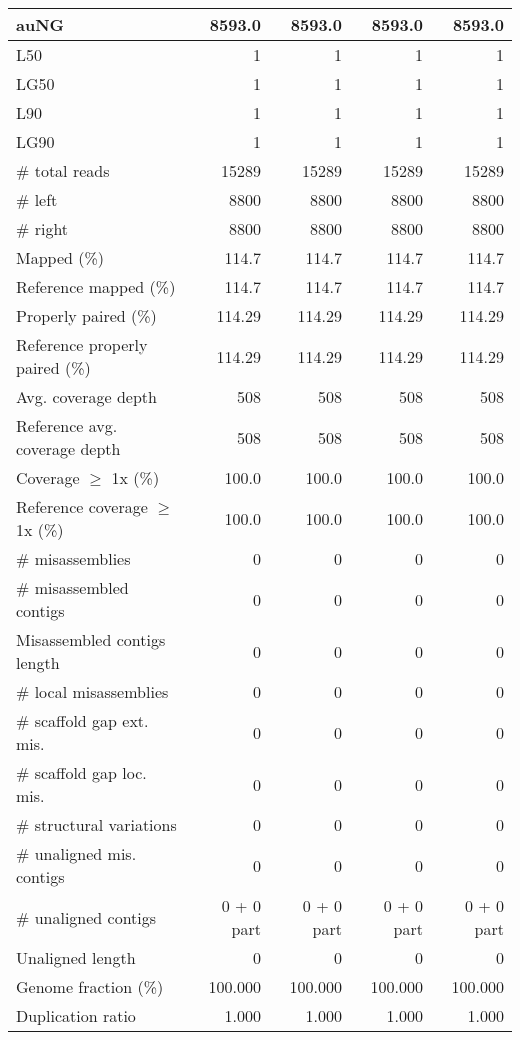 \documentclass[12pt,a4paper]{article}
\begin{document}
\begin{table}[ht]
\begin{center}
\begin{tabular}{|l*{4}{|r}|}
auNG & 8593.0 & 8593.0 & 8593.0 & 8593.0 \\ \hline
L50 & 1 & 1 & 1 & 1 \\ \hline
LG50 & 1 & 1 & 1 & 1 \\ \hline
L90 & 1 & 1 & 1 & 1 \\ \hline
LG90 & 1 & 1 & 1 & 1 \\ \hline
\# total reads & 15289 & 15289 & 15289 & 15289 \\ \hline
\# left & 8800 & 8800 & 8800 & 8800 \\ \hline
\# right & 8800 & 8800 & 8800 & 8800 \\ \hline
Mapped (\%) & 114.7 & 114.7 & 114.7 & 114.7 \\ \hline
Reference mapped (\%) & 114.7 & 114.7 & 114.7 & 114.7 \\ \hline
Properly paired (\%) & 114.29 & 114.29 & 114.29 & 114.29 \\ \hline
Reference properly paired (\%) & 114.29 & 114.29 & 114.29 & 114.29 \\ \hline
Avg. coverage depth & 508 & 508 & 508 & 508 \\ \hline
Reference avg. coverage depth & 508 & 508 & 508 & 508 \\ \hline
Coverage $\geq$ 1x (\%) & 100.0 & 100.0 & 100.0 & 100.0 \\ \hline
Reference coverage $\geq$ 1x (\%) & 100.0 & 100.0 & 100.0 & 100.0 \\ \hline
\# misassemblies & 0 & 0 & 0 & 0 \\ \hline
\# misassembled contigs & 0 & 0 & 0 & 0 \\ \hline
Misassembled contigs length & 0 & 0 & 0 & 0 \\ \hline
\# local misassemblies & 0 & 0 & 0 & 0 \\ \hline
\# scaffold gap ext. mis. & 0 & 0 & 0 & 0 \\ \hline
\# scaffold gap loc. mis. & 0 & 0 & 0 & 0 \\ \hline
\# structural variations & 0 & 0 & 0 & 0 \\ \hline
\# unaligned mis. contigs & 0 & 0 & 0 & 0 \\ \hline
\# unaligned contigs & 0 + 0 part & 0 + 0 part & 0 + 0 part & 0 + 0 part \\ \hline
Unaligned length & 0 & 0 & 0 & 0 \\ \hline
Genome fraction (\%) & 100.000 & 100.000 & 100.000 & 100.000 \\ \hline
Duplication ratio & 1.000 & 1.000 & 1.000 & 1.000 \\ \hline

\end{tabular}
\end{center}
\end{table}
\end{document}
